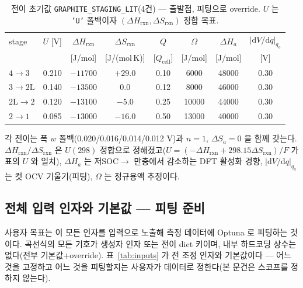 \documentclass[11pt,a4paper]{article}
\newcommand{\dd}{\mathrm{d}}
\newcommand{\cell}{\mathrm{cell}}
\newcommand{\rxn}{\mathrm{rxn}}
\newcommand{\code}[1]{\texttt{#1}}
\begin{document}
\begin{table}[t]
\centering
\renewcommand{\arraystretch}{1.25}
\caption{전이 초기값 \code{GRAPHITE\_STAGING\_LIT}(4건) — 출발점, 피팅으로 override. $U$ 는 \code{'U'}
폴백이자 $(\Delta H_\rxn,\Delta S_\rxn)$ 정합 목표.}
\label{tab:staging}
\begin{tabular}{l c c c c c c c}
\toprule
stage & $U$ [V] & $\Delta H_\rxn$ & $\Delta S_\rxn$ & $Q$ & $\Omega$ & $\Delta H_a$ & $|\dd V/\dd q|_{q_a}$ \\
 &  & [J/mol] & [J/(mol\,K)] & [$Q_\cell$] & [J/mol] & [J/mol] & [V] \\
\midrule
$4\!\to\!3$   & 0.210 & $-11700$ & $+29.0$ & 0.10 & 6000  & 48000 & 0.30 \\
$3\!\to\!2\mathrm L$ & 0.140 & $-13500$ & $0.0$   & 0.12 & 8000  & 46000 & 0.30 \\
$2\mathrm L\!\to\!2$ & 0.120 & $-13100$ & $-5.0$  & 0.25 & 10000 & 44000 & 0.30 \\
$2\!\to\!1$   & 0.085 & $-13000$ & $-16.0$ & 0.50 & 13000 & 40000 & 0.30 \\
\bottomrule
\end{tabular}
\end{table}

각 전이는 폭 $w$ 폴백(0.020/0.016/0.014/0.012 V)과 $n=1$, $\Delta S_a=0$ 을 함께 갖는다. $\Delta H_\rxn/\Delta S_\rxn$
은 $U(298)$ 정합으로 정해졌고($U=(-\Delta H_\rxn+298.15\Delta S_\rxn)/F$ 가 표의 $U$ 와 일치), $\Delta H_a$ 는 저SOC$\to$
만충에서 감소하는 DFT 활성화 경향, $|\dd V/\dd q|_{q_a}$ 는 컷 OCV 기울기(피팅), $\Omega$ 는 정규용액 추정이다.

\subsection{전체 입력 인자와 기본값 — 피팅 준비}
사용자 목표는 이 모든 인자를 입력으로 노출해 측정 데이터에 Optuna 로 피팅하는 것이다. 곡선식의 모든 기호가 생성자 인자
또는 전이 dict 키이며, 내부 하드코딩 상수는 없다(전부 기본값$+$override). 표~\ref{tab:inputs} 가 전 조정 인자와
기본값이다 — 어느 것을 고정하고 어느 것을 피팅할지는 사용자가 데이터로 정한다(본 문건은 스코프를 정하지 않는다).
\end{document}
